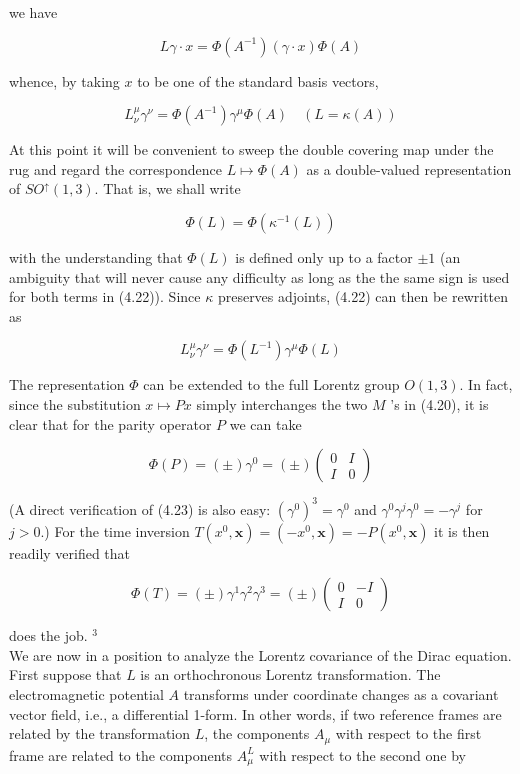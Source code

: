\documentclass[10pt, letterpaper]{article}
\begin{document}
we have

$$
L \gamma \cdot x=\Phi\left(A^{-1}\right)(\gamma \cdot x) \Phi(A)
$$

whence, by taking $x$ to be one of the standard basis vectors,

$$
L_{\nu}^{\mu} \gamma^{\nu}=\Phi\left(A^{-1}\right) \gamma^{\mu} \Phi(A) \quad(L=\kappa(A))
$$

At this point it will be convenient to sweep the double covering map under the rug and regard the correspondence $L \mapsto \Phi(A)$ as a double-valued representation of $S O^{\uparrow}(1,3)$. That is, we shall write

$$
\Phi(L)=\Phi\left(\kappa^{-1}(L)\right)
$$

with the understanding that $\Phi(L)$ is defined only up to a factor $\pm 1$ (an ambiguity that will never cause any difficulty as long as the the same sign is used for both terms in (4.22)). Since $\kappa$ preserves adjoints, (4.22) can then be rewritten as

$$
L_{\nu}^{\mu} \gamma^{\nu}=\Phi\left(L^{-1}\right) \gamma^{\mu} \Phi(L)
$$

The representation $\Phi$ can be extended to the full Lorentz group $O(1,3)$. In fact, since the substitution $x \mapsto P x$ simply interchanges the two $M$ 's in (4.20), it is clear that for the parity operator $P$ we can take

$$
\Phi(P)=( \pm) \gamma^{0}=( \pm)\left(\begin{array}{cc}
0 & I \\
I & 0
\end{array}\right)
$$

(A direct verification of (4.23) is also easy: $\left(\gamma^{0}\right)^{3}=\gamma^{0}$ and $\gamma^{0} \gamma^{j} \gamma^{0}=-\gamma^{j}$ for $j>0$.) For the time inversion $T\left(x^{0}, \mathbf{x}\right)=\left(-x^{0}, \mathbf{x}\right)=-P\left(x^{0}, \mathbf{x}\right)$ it is then readily verified that

$$
\Phi(T)=( \pm) \gamma^{1} \gamma^{2} \gamma^{3}=( \pm)\left(\begin{array}{cc}
0 & -I \\
I & 0
\end{array}\right)
$$

does the job. ${ }^{3}$\\
We are now in a position to analyze the Lorentz covariance of the Dirac equation. First suppose that $L$ is an orthochronous Lorentz transformation. The electromagnetic potential $A$ transforms under coordinate changes as a covariant vector field, i.e., a differential 1-form. In other words, if two reference frames are related by the transformation $L$, the components $A_{\mu}$ with respect to the first frame are related to the components $A_{\mu}^{L}$ with respect to the second one by
\end{document}
